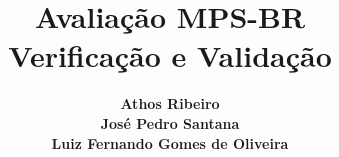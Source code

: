 
\title[Avaliação - Verificação e Validação]
{\textbf{\Large{Avaliação MPS-BR\\ Verificação e Validação}}
}

\author[Athos, Gepeto, Luiz]%
{\textbf{\small{
Athos Ribeiro\\
José Pedro Santana\\
Luiz Fernando Gomes de Oliveira\\
}}}
\date{} %
